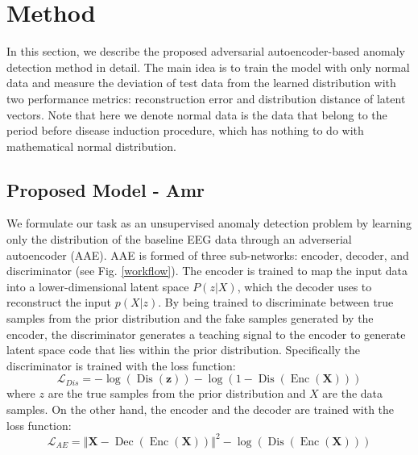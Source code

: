 \documentclass{article}
\begin{document}
	
	\section{Method}
	In this section, we describe the proposed adversarial autoencoder-based anomaly detection method in detail. The main idea is to train the model with only normal data and measure the deviation of test data from the learned distribution with two performance metrics: reconstruction error and distribution distance of latent vectors. Note that here we denote normal data is the data that belong to the period before disease induction procedure, which has nothing to do with mathematical normal distribution.
	
	\subsection{Proposed Model - Amr}
	We formulate our task as an unsupervised anomaly detection problem by learning only the distribution of the baseline EEG data through an adverserial autoencoder (AAE). AAE is formed of three sub-networks: encoder, decoder, and discriminator (see Fig. \ref{workflow}). The encoder is trained to map the input data into a lower-dimensional latent space $P(z|X)$, which the decoder uses to reconstruct the input $p(X|z)$. By being trained to discriminate between true samples from the prior distribution and the fake samples generated by the encoder, the discriminator generates a teaching signal to the encoder to generate latent space code that lies within the prior distribution. Specifically the discriminator is trained with the loss function:
	\begin{equation}
	\mathcal{L}_{D i s}=-\log (\operatorname{Dis}(\mathbf{z}))-\log (1-\operatorname{Dis}(\operatorname{Enc}(\mathbf{X})))
	\end{equation}
	where $z$ are the true samples from the prior distribution and $X$ are the data samples. On the other hand, the encoder and the decoder are trained with the loss function:
	\begin{equation}
	\mathcal{L}_{AE}= \left\Vert \mathbf{X} - \operatorname{Dec}(\operatorname{Enc}(\mathbf{X})) \right\Vert^2 -\log (\operatorname{Dis}(\operatorname{Enc}(\mathbf{X})))
	\end{equation}
	
\end{document}
